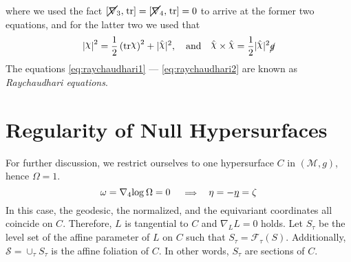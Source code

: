 \documentclass[12pt, a4paper]{report}
\theoremstyle{bfnote}
\newcommand{\underit}[1]{\textit{\underbar{#1}}}
\newcommand{\chits}{\raisebox{0.5ex}{$\chi$}} %
\begin{document}
where we used the fact $[\cancel{\nabla}_3, \hspace{0.1em}\mathrm{tr}] =
[\cancel{\nabla}_4, \hspace{0.1em}\mathrm{tr}] = 0$ to arrive at the former two
equations, and for the latter two we used that
\begin{equation*}
    \left|\chits\right|^2 = \frac{1}{2}\left(\mathrm{tr}\chits\right)^2 + |\hat{\chits}|^2, \quad \text{and} \quad \hat{\chits}\times\hat{\chits} = \frac{1}{2}|\hat{\chits}|^2\cancel{g}
\end{equation*}
The equations \eqref{eq:raychaudhari1} --- \eqref{eq:raychaudhari2} are known as
\textit{Raychaudhari equations}.



\section{Regularity of Null Hypersurfaces}
For further discussion, we restrict ourselves to one hypersurface $C$ in
$\left(\mathcal{M}, g\right)$, hence $\Omega = 1$.
\begin{equation*}
    \omega = \nabla_4\mathrm{log}\hspace{0.2em}\Omega = 0\; \quad \scalebox{0.8}{$\implies$} \quad \eta = -\underit{$\eta$} = \zeta
\end{equation*}
In this case, the geodesic, the normalized, and the equivariant coordinates all
coincide on $C$. Therefore, $L$ is tangential to $C$ and $\nabla_L L = 0$ holds.
Let $S_\tau$ be the level set of the affine parameter of $L$ on $C$ such that
$S_\tau = \mathcal{F}_\tau\left(S\right)$. Additionally, $\mathit{\mathcal{S}} =
\cup_\tau S_\tau$ is the affine foliation of $C$. In other words, $S_\tau$ are
sections of $C$.
\end{document}
